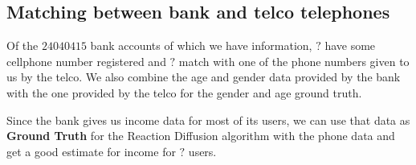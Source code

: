 \subsection{Matching between bank and telco telephones}

Of the \( 24040415 \) bank accounts of which we have information, \( ? \) have some cellphone number registered and \( ? \) match with one of the phone numbers given to us by the telco. We also combine the age and gender data provided by the bank with the one provided by the telco for the gender and age ground truth.

Since the bank gives us income data for most of its users, we can use that data as \textbf{Ground Truth} for the Reaction Diffusion algorithm with the phone data and get a good estimate for income for \( ? \) users.
